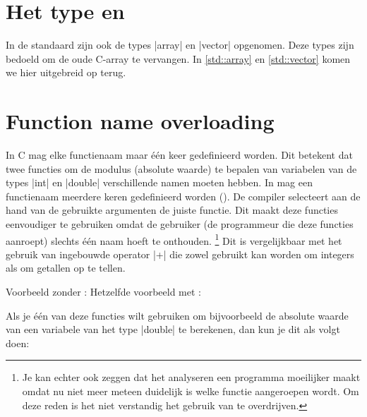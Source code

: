 \begin{cpplstShortInline}

\section[Het type \texttt{array} en \texttt{vector}]{Het type \texorpdfstring{}{array} en \texorpdfstring{}{vector}}
\label{sec:introarryvector}
In de \Cpp{} standaard  zijn ook de types |array| en |vector| opgenomen.
Deze types zijn bedoeld om de oude C\hyp{}array te vervangen.
In \cref{std::array} en \cref{std::vector} komen we hier uitgebreid op terug.

\section{Function name overloading}
\label{sec:functionoverloading}
In C mag elke functienaam maar één keer gedefinieerd worden.
Dit betekent dat twee functies om de modulus (absolute waarde) te bepalen van variabelen van de types |int| en |double| verschillende namen moeten hebben.
In \Cpp{} mag een functienaam meerdere keren gedefinieerd worden (\emph{}).
De compiler selecteert aan de hand van de gebruikte argumenten de juiste functie.
Dit maakt deze functies eenvoudiger te gebruiken omdat de gebruiker (de programmeur die deze functies aanroept) slechts één naam hoeft te onthouden.%
\footnote{%
    Je kan echter ook zeggen dat  het analyseren een programma moeilijker maakt omdat nu niet meer meteen duidelijk is welke functie aangeroepen wordt.
    Om deze reden is het niet verstandig het gebruik van  te overdrijven.
}
Dit is vergelijkbaar met het gebruik van ingebouwde operator |+| die zowel gebruikt kan worden om integers als om  getallen op te tellen.

Voorbeeld zonder :
Hetzelfde voorbeeld met :

Als je één van deze  functies wilt gebruiken om bijvoorbeeld de absolute waarde van een variabele van het type |double| te berekenen, dan kun je dit als volgt doen:


\end{cpplstShortInline}
